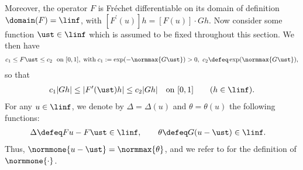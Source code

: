 \documentclass[10pt]{article}
\theoremstyle{definition}
\begin{document}
Moreover, the operator $ F $ is Fr\'{e}chet differentiable on its domain of definition $ \domain(F) = \linf $, with
$ [F^\prime(u)] h=[F(u)] \cdot Gh $.
%
Now consider some function $ \ust \in \linf $ which is assumed to be fixed throughout this section. We then have
%
\begin{align*}
c_1 \le F\ust \le c_2 \ \textup{ on } [0,1], \; \mbox{with} \;
c_1 := \exp(-\normmax{G\ust}) > 0, \ c_2 \defeq \exp(\normmax{G\ust}),
\end{align*}
%
so that
%
\begin{align}
c_1 \vert Gh \vert \le  \vert F^\prime(\ust)h \vert \le c_2 \vert Gh \vert \quad \textup{on } [0,1] \qquad (h \in \linf).
\label{eq:Fprimebounds}
\end{align}
%
For any $ u \in \linf $, we denote by $ \Delta = \Delta(u) $ and
$ \theta = \theta(u) $ the following functions:
%
\begin{align*}
\Delta & \defeq Fu-F\ust \in \linf, \qquad \theta \defeq G(u-\ust) \in \linf.
\end{align*}
%
Thus,
$ \normmone{u-\ust} = \normmax{\theta} $, and we refer to  for the definition of
$ \normmone{\cdot}$.
\end{document}
